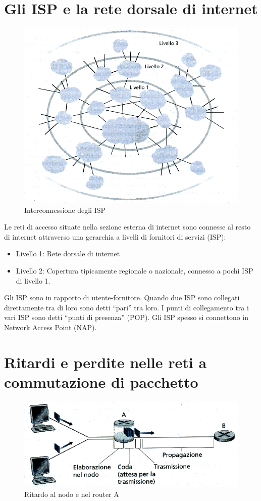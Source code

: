 \documentclass[11pt,a4paper]{book}
\begin{document}
\section{Gli ISP e la rete dorsale di internet}
\begin{figure}
	\includegraphics[scale=0.6]{img/006.png}
	\caption{Interconnessione degli ISP}
\end{figure}
Le reti di accesso situate nella sezione esterna di internet sono connesse al resto di internet attraverso una gerarchia a livelli di fornitori di servizi (ISP):
\begin{itemize}
	\item Livello 1: Rete dorsale di internet
	\item Livello 2: Copertura tipicamente regionale o nazionale, connesso a pochi ISP di livello 1.
\end{itemize}
Gli ISP sono in rapporto di utente-fornitore.
Quando due ISP sono collegati direttamente tra di loro sono detti “pari” tra loro.
I punti di collegamento tra i vari ISP sono detti “punti di presenza” (POP).
Gli ISP spesso si connettono in Network Access Point (NAP).

\section{Ritardi e perdite nelle reti a commutazione di pacchetto}
\begin{figure}
	\begin{center}
		\includegraphics[scale=0.6]{img/007.png}
		\caption{Ritardo al nodo e nel router A}
	\end{center}
\end{figure}
\end{document}
